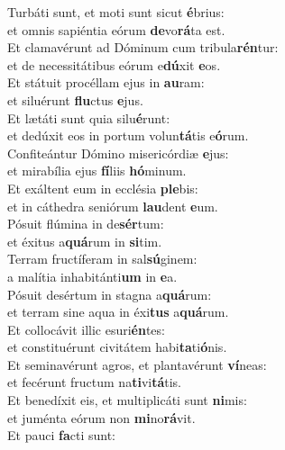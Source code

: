 \oddverse Turbáti sunt, et moti sunt sicut \textbf{é}brius:~\*\\
\oddverse et omnis sapiéntia eórum \textbf{de}vo\textbf{rá}ta est.\\
\evenverse Et clamavérunt ad Dóminum cum tribula\textbf{rén}tur:~\*\\
\evenverse et de necessitátibus eórum e\textbf{dú}xit \textbf{e}os.\\
\oddverse Et státuit procéllam ejus in \textbf{au}ram:~\*\\
\oddverse et siluérunt \textbf{flu}ctus \textbf{e}jus.\\
\evenverse Et lætáti sunt quia silu\textbf{é}runt:~\*\\
\evenverse et dedúxit eos in portum volun\textbf{tá}tis e\textbf{ó}rum.\\
\oddverse Confiteántur Dómino misericórdiæ \textbf{e}jus:~\*\\
\oddverse et mirabília ejus \textbf{fí}liis \textbf{hó}minum.\\
\evenverse Et exáltent eum in ecclésia \textbf{ple}bis:~\*\\
\evenverse et in cáthedra seniórum \textbf{lau}dent \textbf{e}um.\\
\oddverse Pósuit flúmina in de\textbf{sér}tum:~\*\\
\oddverse et éxitus a\textbf{quá}rum in \textbf{si}tim.\\
\evenverse Terram fructíferam in sal\textbf{sú}ginem:~\*\\
\evenverse a malítia inhabitánti\textbf{um} in \textbf{e}a.\\
\oddverse Pósuit desértum in stagna a\textbf{quá}rum:~\*\\
\oddverse et terram sine aqua in éxi\textbf{tus} a\textbf{quá}rum.\\
\evenverse Et collocávit illic esuri\textbf{én}tes:~\*\\
\evenverse et constituérunt civitátem habi\textbf{ta}ti\textbf{ó}nis.\\
\oddverse Et seminavérunt agros, et plantavérunt \textbf{ví}neas:~\*\\
\oddverse et fecérunt fructum na\textbf{ti}vi\textbf{tá}tis.\\
\evenverse Et benedíxit eis, et multiplicáti sunt \textbf{ni}mis:~\*\\
\evenverse et juménta eórum non \textbf{mi}no\textbf{rá}vit.\\
\oddverse Et pauci \textbf{fa}cti sunt:~\*\\
